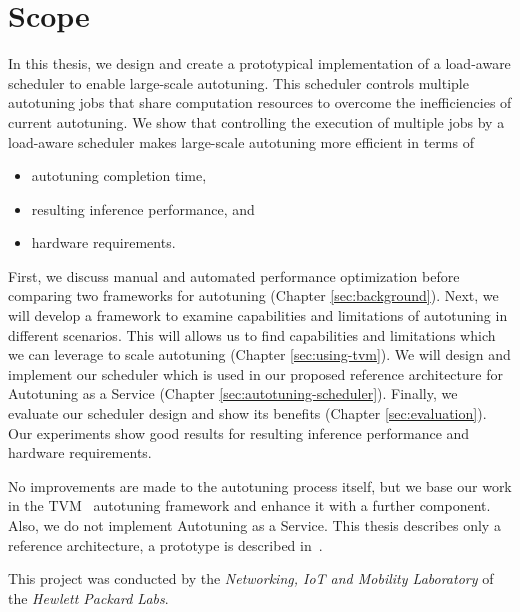 \section{Scope}
In this thesis, we design and create a prototypical implementation of a load-aware scheduler to enable large-scale autotuning. This scheduler controls multiple autotuning jobs that share computation resources to overcome the inefficiencies of current autotuning. We show that controlling the execution of multiple jobs by a load-aware scheduler makes large-scale autotuning more efficient in terms of
\begin{itemize}
	\item autotuning completion time,
	\item resulting inference performance, and
	\item hardware requirements.
\end{itemize}

First, we discuss manual and automated performance optimization before comparing two frameworks for autotuning (Chapter \ref{sec:background}). Next, we will develop a framework to examine capabilities and limitations of autotuning in different scenarios. This will allows us to find capabilities and limitations which we can leverage to scale autotuning (Chapter \ref{sec:using-tvm}). We will design and implement our scheduler which is used in our proposed reference architecture for Autotuning as a Service (Chapter \ref{sec:autotuning-scheduler}). Finally, we evaluate our scheduler design and show its benefits (Chapter \ref{sec:evaluation}). Our experiments show good results for resulting inference performance and hardware requirements.

No improvements are made to the autotuning process itself, but we base our work in the TVM~\cite{Chen.2018b} autotuning framework and enhance it with a further component. Also, we do not implement Autotuning as a Service. This thesis describes only a reference architecture, a prototype is described in~\cite{Cho.2019}.

This project was conducted by the \textit{Networking, IoT and Mobility Laboratory} of the \textit{Hewlett Packard Labs}.
